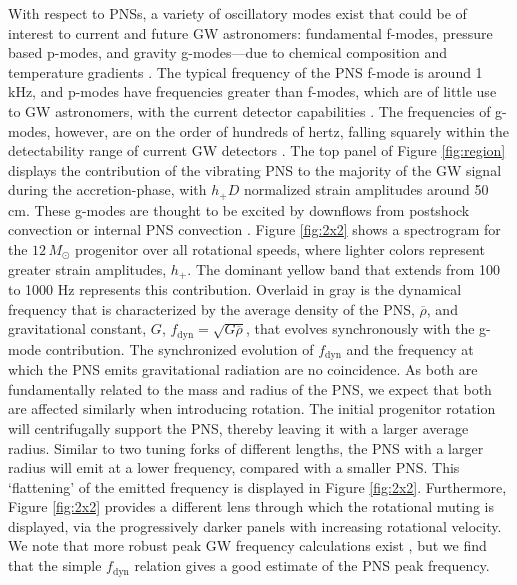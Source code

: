 \documentclass[twocolumn,times]{aastex62}  %
\begin{document}
With respect to PNSs, a variety of oscillatory modes exist that could be of interest to current and future GW astronomers: fundamental f-modes, pressure based p-modes, and gravity g-modes---due to chemical composition and temperature gradients \citep{unno:1989}.  The typical frequency of the PNS f-mode is around 1 kHz, and p-modes have frequencies greater than f-modes, which are of little use to GW astronomers, with the current detector capabilities \citep{ho:2018}.  
The frequencies of g-modes, however, are on the order of hundreds of hertz, falling squarely within the detectability range of current GW detectors \citep{martynov:2016}.  
The top panel of Figure \ref{fig:region} displays the contribution of the vibrating PNS to the majority of the GW signal during the accretion-phase, with $h_+D$ normalized strain amplitudes around 50 cm.  
These g-modes are thought to be excited by downflows from postshock convection or internal PNS convection \citep{marek:2009b,murphy:2009,muller:2013}.  
Figure \ref{fig:2x2} shows a spectrogram for the $12 \, M_\odot$ progenitor over all rotational speeds, where lighter colors represent greater strain amplitudes, $h_+$.  The dominant yellow band that extends from 100 to 1000 Hz represents this contribution.  
Overlaid in gray is the dynamical frequency that is characterized by the average density of the PNS, $\overline{\rho}$, and gravitational constant, $G$, $f_\mathrm{dyn} = \sqrt{G \overline{\rho}}$,  that evolves synchronously with the g-mode contribution.  The synchronized evolution of $f_\mathrm{dyn}$ and the frequency at which the PNS emits gravitational radiation are no coincidence.  As both are fundamentally related to the mass and radius of the PNS, we expect that both are affected similarly when introducing rotation.  The initial progenitor rotation will centrifugally support the PNS, thereby leaving it with a larger average radius.  Similar to two tuning forks of different lengths, the PNS with a larger radius will emit at a lower frequency, compared with a smaller PNS.  This `flattening' of the emitted frequency is displayed in Figure \ref{fig:2x2}.  Furthermore, Figure \ref{fig:2x2} provides a different lens through which the rotational muting is displayed, via the progressively darker panels with increasing rotational velocity.  We note that more robust peak GW frequency calculations exist \citep[e.g.,][]{muller:2013,moro:2018}, but we find that the simple $f_\mathrm{dyn}$ relation gives a good estimate of the PNS peak frequency.
\end{document}

